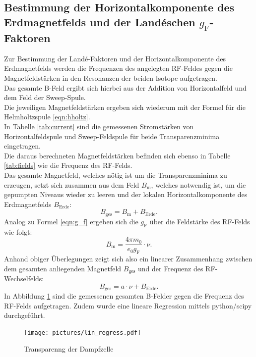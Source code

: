 \subsection{Bestimmung der Horizontalkomponente des Erdmagnetfelds und der Landéschen $g_{\mathrm{F}}$-Faktoren}
Zur Bestimmung der Landé-Faktoren und der Horizontalkomponente des Erdmagnetfelds werden die Frequenzen des angelegten RF-Feldes gegen die Magnetfeldstärken in den Resonanzen der beiden Isotope aufgetragen.\\
Das gesamte B-Feld ergibt sich hierbei aus der Addition von Horizontalfeld und dem Feld der Sweep-Spule.\\
Die jeweiligen Magnetfeldstärken ergeben sich wiederum mit der Formel für die Helmholtzspule \ref{eqn:hholtz}.\\
In Tabelle \ref{tab:current} sind die gemessenen Stromstärken von Horizontalfeldspule und Sweep-Feldspule für beide Transparenzminima eingetragen.\\
Die daraus berechneten Magnetfeldstärken befinden sich ebenso in Tabelle \ref{tab:fields} wie die Frequenz des RF-Felds.\\
Das gesamte Magnetfeld, welches nötig ist um die Transparenzminima zu erzeugen, setzt sich zusammen aus dem Feld $B_{\mathrm{m}}$, welches notwendig ist, um die gepumpten Niveaus wieder zu leeren und der lokalen Horizontalkomponente des Erdmagnetfelds $B_{\mathrm{Erde}}$:
\begin{equation*}
B_{\mathrm{ges}}=B_{\mathrm{m}}+B_{\mathrm{Erde}}\mathrm{.}
\end{equation*}
Analog zu Formel \eqref{eqn:g_f} ergeben sich die $g_{\mathrm{F}}$ über die Feldstärke des RF-Felds wie folgt:
\begin{equation*}
  B_{\mathrm{m}}=\frac{4\pi m_0}{e_0 g_{\mathrm{F}}}\cdot \nu \mathrm{.}
\end{equation*}
Anhand obiger Überlegungen zeigt sich also ein linearer Zusammenhang zwischen dem gesamten anliegenden Magnetfeld $B_{\mathrm{ges}}$ und der Frequenz des RF-Wechselfelds:
\begin{equation*}
    B_{\mathrm{ges}}=a\cdot \nu+B_{\mathrm{Erde}} \mathrm{.}
\end{equation*}
In Abbildung \ref{fig:regress} sind die gemessenen gesamten B-Felder gegen die Frequenz des RF-Felds aufgetragen. Zudem wurde eine lineare Regression mittels python/scipy \cite{scipy} durchgeführt.
\begin{figure}
  \centering
  \texttt{[image: pictures/lin\_regress.pdf]}
  \caption{Transparenng der Dampfzelle}
  \label{fig:regress}
\end{figure}

